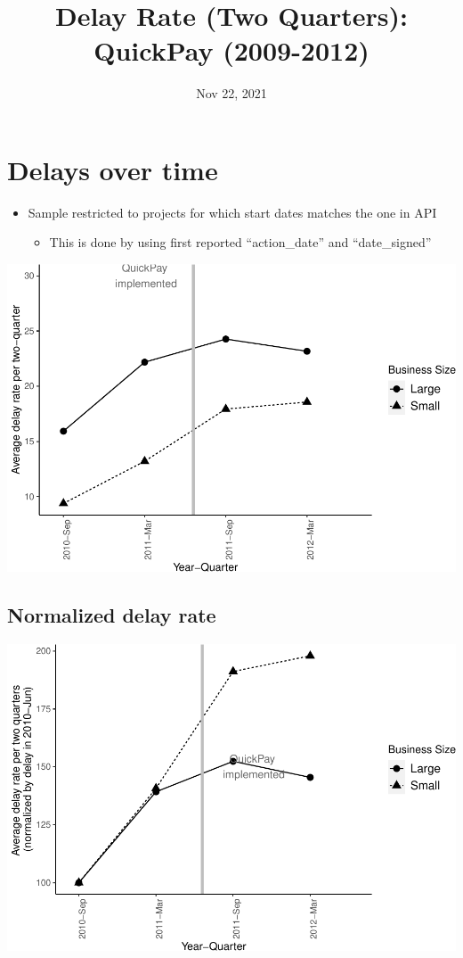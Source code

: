\documentclass[
]{article}
\title{Delay Rate (Two Quarters): QuickPay (2009-2012)}
\author{}
\date{\vspace{-2.5em}Nov 22, 2021}
\providecommand{\tightlist}{%
  \setlength{\itemsep}{0pt}\setlength{\parskip}{0pt}}
\begin{document}
\maketitle

\hypertarget{delays-over-time}{%
\section{Delays over time}\label{delays-over-time}}

\begin{itemize}
\tightlist
\item
  Sample restricted to projects for which start dates matches the one in
  API

  \begin{itemize}
  \tightlist
  \item
    This is done by using first reported ``action\_date'' and
    ``date\_signed''
  \end{itemize}
\end{itemize}

\includegraphics{qp_first_delay_two_quarters_files/figure-latex/plot_pc_delay-1.pdf}

\hypertarget{normalized-delay-rate}{%
\subsection{Normalized delay rate}\label{normalized-delay-rate}}

\includegraphics{qp_first_delay_two_quarters_files/figure-latex/normalized_plot-1.pdf}
\end{document}
